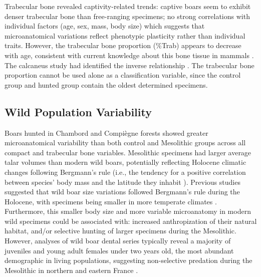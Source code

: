 \documentclass[12pt,a4paper]{article}
\begin{document}
Trabecular bone revealed captivity-related trends: captive boars seem to exhibit denser trabecular bone than free-ranging specimens; no strong correlations with individual factors (age, sex, mass, body size) which suggests that microanatomical variations reflect phenotypic plasticity rather than individual traits. However, the trabecular bone proportion (\%Trab) appears to decrease with age, consistent with current knowledge about this bone tissue in mammals \cite{macdonaldAgerelatedPatternsTrabecular2011,parfittAgerelatedStructuralChanges1984}. The calcaneus study had identified the inverse relationship \cite{cottereauCanGrowthCaptivity2023ab}. The trabecular bone proportion cannot be used alone as a classification variable, since the control group and hunted group contain the oldest determined specimens.


\subsection{Wild Population Variability}
Boars hunted in Chambord and Compiègne forests showed greater microanatomical variability than both control and Mesolithic groups across all compact and trabecular bone variables. Mesolithic specimens had larger average talar volumes than modern wild boars, potentially reflecting Holocene climatic changes following Bergmann's rule (i.e., the tendency for a positive correlation between species' body mass and the latitude they inhabit \cite{blackburnGeographicGradientsBody1999}). Previous studies suggested that wild boar size variations followed Bergmann's rule  during the Holocene, with specimens being smaller in more temperate climates \cite{albarellaSizeShapeEurasian2009a, cucchi4500YearsMorphological2023t}.
Furthermore, this smaller body size and more variable microanatomy in modern wild specimens could be associated with: increased anthropization of their natural habitat, and/or selective hunting of larger specimens during the Mesolithic. However, analyses of wild boar dental series typically reveal a majority of juveniles and young adult females under two years old, the most abundant demographic in living populations, suggesting non-selective predation during the Mesolithic in northern and eastern France \cite{searaChasserAuMesolithique2010, bridaultEconomiesChasseEpipaleolithiques1994}.
\end{document}
